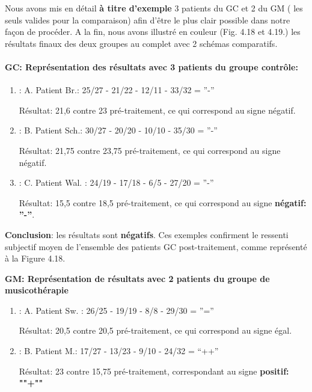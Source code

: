 Nous avons mis en détail  \textbf{à titre d'exemple } 3 patients du GC et 2 du GM
( les seuls valides pour la comparaison) afin d'être le plus clair possible
dans notre façon de procéder.
A la fin, nous avons illustré en couleur (Fig. 4.18 et 4.19.) les
résultats finaux des deux groupes au complet avec 2 schémas
comparatifs.

\paragraph{ GC: Représentation des résultats avec 3 patients du groupe contrôle:}

\begin{enumerate}
\item : A. Patient Br.:  25/27 - 21/22 - 12/11 - 33/32 =  ''-''

          Résultat: 21,6 contre 23 pré-traitement,  ce qui
        correspond au signe négatif.
      \item : B. Patient Sch.: 30/27 - 20/20 -  10/10 - 35/30 = ''-''

         Résultat: 21,75 contre 23,75 pré-traitement, ce qui
        correspond au signe négatif.

 		\item :  C. Patient Wal. : 24/19 -  17/18 - 6/5 -
                  27/20 =  ''-''

                  Résultat: 15,5 contre 18,5 pré-traitement, ce qui
        correspond au signe \textbf{négatif: ''-''}.
 	\end{enumerate}


       \textbf{ Conclusion}: les résultats sont \textbf{négatifs}.
        Ces exemples confirment
        le ressenti subjectif moyen de l'ensemble des patients
        GC post-traitement, comme représenté à la Figure 4.18.

       \textbf{ GM: Représentation de résultats avec 2 patients du groupe de musicothérapie}

\begin{enumerate}
 		\item : A. Patient Sw. : 26/25 - 19/19 - 8/8 - 29/30 =  ''=''



  Résultat: 20,5 contre 20,5 pré-traitement, ce qui
        correspond au signe égal.



 		\item : B. Patient M.: 17/27 - 13/23 -  9/10 - 24/32 = ``++''

              Résultat: 23 contre 15,75 pré-traitement, correspondant
              au signe \textbf{positif: ""+""}
            \end{enumerate}

